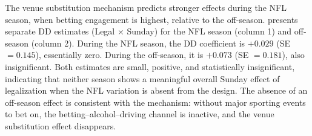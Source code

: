 \documentclass[12pt]{article}
\begin{document}
The venue substitution mechanism predicts stronger effects during the NFL season, when betting engagement is highest, relative to the off-season.  presents separate DD estimates (Legal $\times$ Sunday) for the NFL season (column 1) and off-season (column 2). During the NFL season, the DD coefficient is $+0.029$ (SE $= 0.145$), essentially zero. During the off-season, it is $+0.073$ (SE $= 0.181$), also insignificant. Both estimates are small, positive, and statistically insignificant, indicating that neither season shows a meaningful overall Sunday effect of legalization when the NFL variation is absent from the design. The absence of an off-season effect is consistent with the mechanism: without major sporting events to bet on, the betting--alcohol--driving channel is inactive, and the venue substitution effect disappears.
\end{document}
